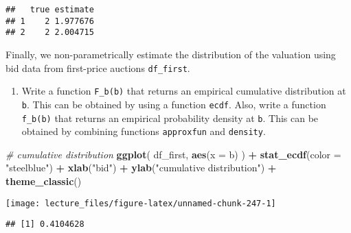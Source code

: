 \documentclass[
]{book}
\newenvironment{Shaded}{\begin{snugshade}}{\end{snugshade}}
\newcommand{\AttributeTok}[1]{\textcolor[rgb]{0.13,0.29,0.53}{#1}}
\newcommand{\CommentTok}[1]{\textcolor[rgb]{0.56,0.35,0.01}{\textit{#1}}}
\newcommand{\FloatTok}[1]{\textcolor[rgb]{0.00,0.00,0.81}{#1}}
\newcommand{\FunctionTok}[1]{\textcolor[rgb]{0.13,0.29,0.53}{\textbf{#1}}}
\newcommand{\NormalTok}[1]{#1}
\newcommand{\OtherTok}[1]{\textcolor[rgb]{0.56,0.35,0.01}{#1}}
\newcommand{\SpecialCharTok}[1]{\textcolor[rgb]{0.81,0.36,0.00}{\textbf{#1}}}
\newcommand{\StringTok}[1]{\textcolor[rgb]{0.31,0.60,0.02}{#1}}
\providecommand{\tightlist}{%
  \setlength{\itemsep}{0pt}\setlength{\parskip}{0pt}}
\begin{document}
\begin{verbatim}
##   true estimate
## 1    2 1.977676
## 2    2 2.004715
\end{verbatim}

Finally, we non-parametrically estimate the distribution of the valuation using bid data from first-price auctions \texttt{df\_first}.

\begin{enumerate}
\def\labelenumi{\arabic{enumi}.}
\setcounter{enumi}{9}
\tightlist
\item
  Write a function \texttt{F\_b(b)} that returns an empirical cumulative distribution at \texttt{b}. This can be obtained by using a function \texttt{ecdf}.
  Also, write a function \texttt{f\_b(b)} that returns an empirical probability density at \texttt{b}. This can be obtained by combining functions \texttt{approxfun} and \texttt{density}.
\end{enumerate}

\begin{Shaded}
\begin{Highlighting}[]
\CommentTok{\# cumulative distribution}
\FunctionTok{ggplot}\NormalTok{(}
\NormalTok{  df\_first, }
  \FunctionTok{aes}\NormalTok{(}\AttributeTok{x =}\NormalTok{ b)}
\NormalTok{  ) }\SpecialCharTok{+} 
  \FunctionTok{stat\_ecdf}\NormalTok{(}\AttributeTok{color =} \StringTok{"steelblue"}\NormalTok{) }\SpecialCharTok{+}
  \FunctionTok{xlab}\NormalTok{(}\StringTok{"bid"}\NormalTok{) }\SpecialCharTok{+} 
  \FunctionTok{ylab}\NormalTok{(}\StringTok{"cumulative distribution"}\NormalTok{) }\SpecialCharTok{+} 
  \FunctionTok{theme\_classic}\NormalTok{()}
\end{Highlighting}
\end{Shaded}

\begin{center}\texttt{[image: lecture\_files/figure-latex/unnamed-chunk-247-1]} \end{center}

\begin{Shaded}
\end{Shaded}

\begin{verbatim}
## [1] 0.4104628
\end{verbatim}
\end{document}
